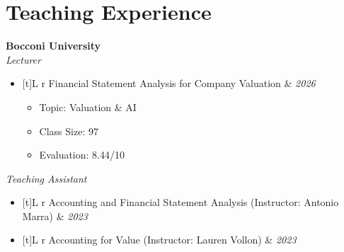 \section{Teaching Experience}
  \resumeSubHeadingListStart
    \vspace{2mm}
    \item \textbf{Bocconi University} \\
    \vspace{1mm}
    \noindent\textit{\footnotesize{Lecturer}}
    \vspace{-1mm}
    \begin{itemize}[leftmargin=3ex,labelsep=1.2mm,topsep=0mm]
      \renewcommand{\labelitemi}{\normalfont\footnotesize\textendash}
      \item \begin{tabularx}{\linewidth}[t]{L r}
        \footnotesize{Financial Statement Analysis for Company Valuation} & \textit{\footnotesize{2026}}
      \end{tabularx}
      \begin{itemize}[leftmargin=3ex,labelsep=1.2mm,topsep=0.3mm,itemsep=0mm,parsep=0mm,label={\normalfont\scriptsize$\cdot$}]
        \item \scriptsize{Topic: Valuation \& AI}
        \item \scriptsize{Class Size: 97}
        \item \scriptsize{Evaluation: 8.44/10}
      \end{itemize}
    \end{itemize}

    \vspace{1mm}
    
    \noindent\textit{\footnotesize{Teaching Assistant}}
    \vspace{-1mm}
    \begin{itemize}[leftmargin=3ex,labelsep=1.2mm]
      \renewcommand{\labelitemi}{\normalfont\footnotesize\textendash}
      \item \begin{tabularx}{\linewidth}[t]{L r}
        \footnotesize{Accounting and Financial Statement Analysis (Instructor: Antonio Marra)} & \textit{\footnotesize{2023}}
      \end{tabularx}
      \item \begin{tabularx}{\linewidth}[t]{L r}
        \footnotesize{Accounting for Value (Instructor: Lauren Vollon)} & \textit{\footnotesize{2023}}
      \end{tabularx}
    \end{itemize}

    \vspace{1mm}
\resumeSubHeadingListEnd
